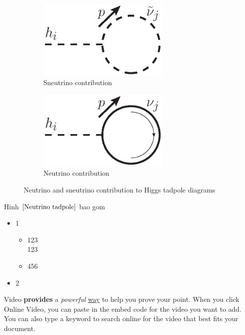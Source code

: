 \documentclass[a4paper, 11pt]{article}
\begin{document}
	\begin{figure}[h]
		\centering
		\begin{subfigure}{5cm}
			\centering
			\includegraphics[width=0.7\textwidth]{hsvsv_tadpole.eps}
			\caption{Sneutrino contribution}
			\label{Sneutrino tadpole}
		\end{subfigure}
		\begin{subfigure}{0.49\linewidth}
			\centering
			\includegraphics[width=0.7\textwidth]{hfvfv_tadpole.eps}
			\caption{Neutrino contribution}
			\label{Neutrino tadpole}
		\end{subfigure}
		\caption{Neutrino and sneutrino contribution to Higgs tadpole diagrams}
\label{Tadpole diagrams}
	\end{figure}

	Hinh $ \ref{Neutrino tadpole} $ bao gom
	\begin{itemize}
		\item 1
		\begin{itemize}
			\item 123\\
			123
			\item 456
		\end{itemize}
		\item 2
	\end{itemize}
	Video \textbf{provides} a \textit{powerful} \underline{way} to help you prove your point. When you click Online Video, you can paste in the embed code for the video you want to add. You can also type a keyword to search online for the video that best fits your document.\\
	
\end{document}
